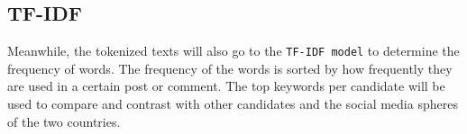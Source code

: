 
\subsection{TF-IDF}
Meanwhile, the tokenized texts will also go to the \texttt{TF-IDF model} to determine the frequency of words. The frequency of the words is sorted by how frequently they are used in a certain post or comment. The top keywords per candidate will be used to compare and contrast with other candidates and the social media spheres of the two countries.

